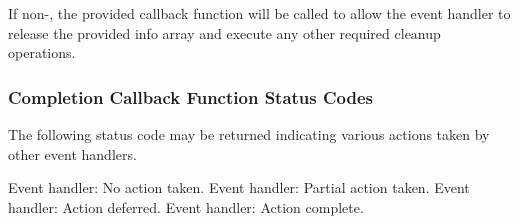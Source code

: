 If non-, the provided callback function will be called to allow the event handler to release the provided info array and execute any other required cleanup operations.

\subsubsection{Completion Callback Function Status Codes}

The following status code may be returned indicating various actions taken by other event handlers.

\begin{constantdesc}
%
Event handler: No action taken.
%
Event handler: Partial action taken.
%
Event handler: Action deferred.
%
Event handler: Action complete.
%
\end{constantdesc}

